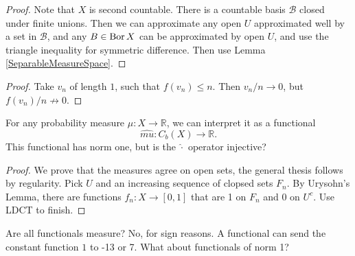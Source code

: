 
\begin{proof}
    Note that \( X \) is second countable. There is a countable basis \( \mathcal{B} \) closed under finite unions. Then we can approximate any open \( U \) approximated well by a set in \( \mathcal{B} \), and any \( B \in \operatorname{Bor} X \) can be approximated by open \( U \), and use the triangle inequality for symmetric difference. Then use Lemma \ref{SeparableMeasureSpace}.
\end{proof}


\begin{proof}
Take \( v_n \) of length \( 1 \), such that \( f(v_n) \leqslant n \). Then \( v_n/n \to 0 \), but \( f(v_n)/n \not\to 0 \).
\end{proof}

For any probability measure \( \mu : X \to \mathbb{R} \), we can interpret it as a functional
\[ 
    \hat{mu}: C_b(X) \to \mathbb{R}.
\]
This functional has norm one, but is the \( \hat{\cdot} \) operator injective?


\begin{proof}
    We prove that the measures agree on open sets, the general thesis follows by regularity. Pick \( U \) and an increasing sequence of clopsed sets \( F_n \). By Urysohn's Lemma, there are functions \( f_n: X \to [0,1] \) that are 1 on \( F_n \) and 0 on \( U^c \). Use LDCT to finish.
\end{proof}

Are all functionals measure? No, for sign reasons. A functional can send the constant function \( 1 \) to -13 or 7. What about functionals of norm 1?

